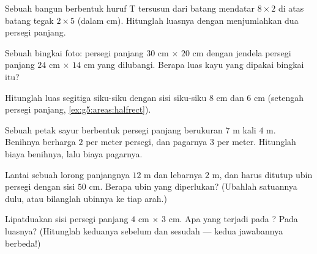 \begin{exercise}[$\star$]\label{exo:g5:areas:6}
Sebuah bangun berbentuk huruf T tersusun dari batang mendatar
$8 \times 2$ di atas batang tegak $2 \times 5$ (dalam cm).
Hitunglah luasnya dengan menjumlahkan dua persegi panjang.
\end{exercise}

\begin{exercise}[$\star$]\label{exo:g5:areas:7}
Sebuah bingkai foto: persegi panjang $30$ cm $\times$ $20$ cm dengan
jendela persegi panjang $24$ cm $\times$ $14$ cm yang dilubangi.
Berapa luas kayu yang dipakai bingkai itu?
\end{exercise}

\begin{exercise}[$\star$]\label{exo:g5:areas:8}
Hitunglah luas segitiga siku-siku dengan sisi siku-siku $8$ cm dan
$6$ cm (setengah persegi panjang, \cref{ex:g5:areas:halfrect}).
\end{exercise}

\begin{exercise}[$\star$]\label{exo:g5:areas:9}
Sebuah petak sayur berbentuk persegi panjang berukuran $7$ m kali
$4$ m. Benihnya berharga $2$ per meter persegi, dan pagarnya $3$
per meter. Hitunglah biaya benihnya, lalu biaya pagarnya.
\end{exercise}

\begin{exercise}[$\star\star$]\label{exo:g5:areas:10}
Lantai sebuah lorong panjangnya $12$ m dan lebarnya $2$ m, dan harus
ditutup ubin persegi dengan sisi $50$ cm. Berapa ubin yang
diperlukan? (Ubahlah satuannya dulu, atau bilanglah ubinnya ke tiap arah.)
\end{exercise}

\begin{exercise}[$\star\star$]\label{exo:g5:areas:11}
Lipatduakan sisi persegi panjang $4$ cm $\times$ $3$ cm. Apa yang
terjadi pada ? Pada luasnya? (Hitunglah keduanya sebelum
dan sesudah --- kedua jawabannya berbeda!)

\end{exercise}
